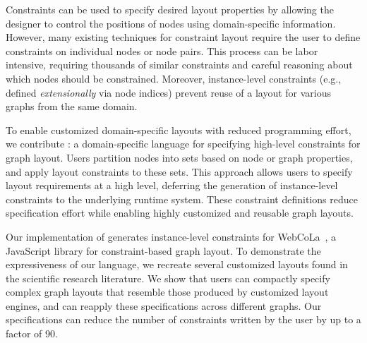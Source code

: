 Constraints can be used to specify desired layout properties by
allowing the designer to control the positions of nodes using
domain-specific information.  However, many existing techniques
for constraint layout require the user to define constraints
on individual nodes or node pairs. This process can be labor
intensive, requiring thousands of similar constraints and careful reasoning
about which nodes should be constrained. Moreover, instance-level constraints 
(e.g., defined \emph{extensionally} via node indices) prevent
reuse of a layout for various graphs from the same domain.

To enable customized domain-specific layouts with reduced
programming effort, we contribute \projectname: a domain-specific language for
specifying high-level constraints for graph layout. Users partition nodes
into sets based on node or graph properties, and apply layout constraints
to these sets. This approach allows users to specify layout
requirements at a high level, deferring the generation of
instance-level constraints to the underlying runtime system. These constraint
definitions reduce specification effort while enabling highly
customized and reusable graph layouts.

Our implementation of \projectname generates instance-level constraints for
WebCoLa~\cite{WebCoLa}, a JavaScript library for constraint-based graph
layout. To demonstrate the expressiveness of our language, we
recreate several customized layouts found in the scientific research 
literature. We
show that users can compactly specify complex graph layouts that resemble
those produced by customized layout engines, and can reapply these
specifications across different graphs. Our \projectname specifications
can reduce the number of constraints written by the user by up to a 
factor of 90.
